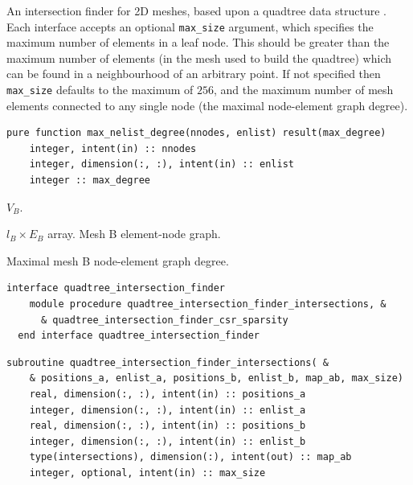 \documentclass{article}
\begin{document}
An intersection finder for 2D meshes, based upon a quadtree data structure
\citep{samet1984}. Each interface accepts an optional \verb+max_size+ argument,
which specifies the maximum number of elements in a leaf node. This should be
greater than the maximum number of elements (in the mesh used to build the
quadtree) which can be found in a neighbourhood of an arbitrary point. If not
specified then \verb+max_size+ defaults to the maximum of $256$, and the maximum
number of mesh elements connected to any single node (the maximal node-element
graph degree).

\begin{lstlisting}[language=FORTRAN]  
  pure function max_nelist_degree(nnodes, enlist) result(max_degree)
    integer, intent(in) :: nnodes
    integer, dimension(:, :), intent(in) :: enlist
    integer :: max_degree
\end{lstlisting}

\begin{description}[font=\ttfamily\bfseries,leftmargin=2.2\parindent,labelindent=1.7\parindent,noitemsep]
  \item[nnodes] $V_B$.
  \item[enlist] $l_B \times E_B$ array. Mesh B element-node graph.
  \item[max\_degree] Maximal mesh B node-element graph degree.
\end{description}

\begin{lstlisting}[language=FORTRAN]  
  interface quadtree_intersection_finder
    module procedure quadtree_intersection_finder_intersections, &
      & quadtree_intersection_finder_csr_sparsity
  end interface quadtree_intersection_finder
\end{lstlisting}

\begin{lstlisting}[language=FORTRAN]
  subroutine quadtree_intersection_finder_intersections( &
    & positions_a, enlist_a, positions_b, enlist_b, map_ab, max_size)
    real, dimension(:, :), intent(in) :: positions_a
    integer, dimension(:, :), intent(in) :: enlist_a
    real, dimension(:, :), intent(in) :: positions_b
    integer, dimension(:, :), intent(in) :: enlist_b
    type(intersections), dimension(:), intent(out) :: map_ab
    integer, optional, intent(in) :: max_size
\end{lstlisting}
\end{document}
